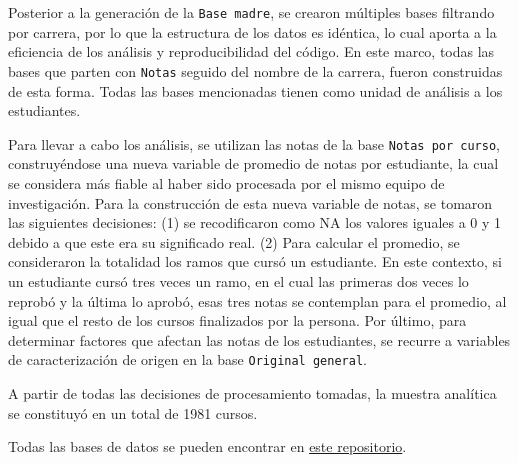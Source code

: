 \documentclass[
  spanish,
  a4paper,
  oneside]{scrbook}
\begin{document}
Posterior a la generación de la \texttt{Base\ madre}, se crearon
múltiples bases filtrando por carrera, por lo que la estructura de los
datos es idéntica, lo cual aporta a la eficiencia de los análisis y
reproducibilidad del código. En este marco, todas las bases que parten
con \texttt{Notas} seguido del nombre de la carrera, fueron construidas
de esta forma. Todas las bases mencionadas tienen como unidad de
análisis a los estudiantes.

Para llevar a cabo los análisis, se utilizan las notas de la base
\texttt{Notas\ por\ curso}, construyéndose una nueva variable de
promedio de notas por estudiante, la cual se considera más fiable al
haber sido procesada por el mismo equipo de investigación. Para la
construcción de esta nueva variable de notas, se tomaron las siguientes
decisiones: (1) se recodificaron como NA los valores iguales a 0 y 1
debido a que este era su significado real. (2) Para calcular el
promedio, se consideraron la totalidad los ramos que cursó un
estudiante. En este contexto, si un estudiante cursó tres veces un ramo,
en el cual las primeras dos veces lo reprobó y la última lo aprobó, esas
tres notas se contemplan para el promedio, al igual que el resto de los
cursos finalizados por la persona. Por último, para determinar factores
que afectan las notas de los estudiantes, se recurre a variables de
caracterización de origen en la base \texttt{Original\ general}.

A partir de todas las decisiones de procesamiento tomadas, la muestra
analítica se constituyó en un total de 1981 cursos.

Todas las bases de datos se pueden encontrar en
\href{https://github.com/tomasurzuam/estudio-notas/tree/main/input/data}{este
repositorio}.
\end{document}
